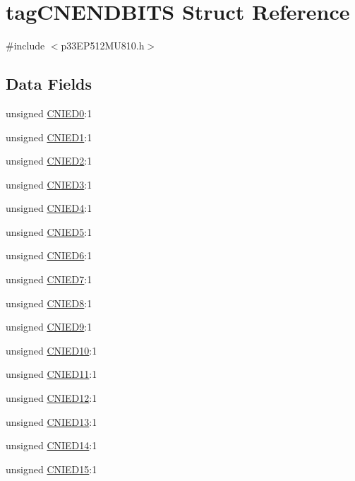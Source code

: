 \hypertarget{structtag_c_n_e_n_d_b_i_t_s}{}\section{tag\+C\+N\+E\+N\+D\+B\+I\+TS Struct Reference}
\label{structtag_c_n_e_n_d_b_i_t_s}


{\ttfamily \#include $<$p33\+E\+P512\+M\+U810.\+h$>$}

\subsection*{Data Fields}
\begin{DoxyCompactItemize}
\item 
unsigned \hyperlink{structtag_c_n_e_n_d_b_i_t_s_a041e181bcc13cfdf4a4053a934ae89eb}{C\+N\+I\+E\+D0}\+:1
\item 
unsigned \hyperlink{structtag_c_n_e_n_d_b_i_t_s_ac9650706edb5cb6b0f3cb6da0e86a325}{C\+N\+I\+E\+D1}\+:1
\item 
unsigned \hyperlink{structtag_c_n_e_n_d_b_i_t_s_a868fe16df021a36a748a28f5f0beb271}{C\+N\+I\+E\+D2}\+:1
\item 
unsigned \hyperlink{structtag_c_n_e_n_d_b_i_t_s_abd6e1802b840d395f5a649f6272fdb16}{C\+N\+I\+E\+D3}\+:1
\item 
unsigned \hyperlink{structtag_c_n_e_n_d_b_i_t_s_a53faa2c6259ed66e4eb2951494c7e3c3}{C\+N\+I\+E\+D4}\+:1
\item 
unsigned \hyperlink{structtag_c_n_e_n_d_b_i_t_s_a5de0f53ff470f45ce1d755d28dc977e1}{C\+N\+I\+E\+D5}\+:1
\item 
unsigned \hyperlink{structtag_c_n_e_n_d_b_i_t_s_a5503c116322a77c3132e97d329d494a7}{C\+N\+I\+E\+D6}\+:1
\item 
unsigned \hyperlink{structtag_c_n_e_n_d_b_i_t_s_af7e614d2f78b8d8a8699f163f7404873}{C\+N\+I\+E\+D7}\+:1
\item 
unsigned \hyperlink{structtag_c_n_e_n_d_b_i_t_s_a5678fe113a6158d62edafa9e2fc3f202}{C\+N\+I\+E\+D8}\+:1
\item 
unsigned \hyperlink{structtag_c_n_e_n_d_b_i_t_s_a55b6caffaf528ff7859ff5eb88158a99}{C\+N\+I\+E\+D9}\+:1
\item 
unsigned \hyperlink{structtag_c_n_e_n_d_b_i_t_s_acaf1eae0717e30a9451cce3a817c9e4e}{C\+N\+I\+E\+D10}\+:1
\item 
unsigned \hyperlink{structtag_c_n_e_n_d_b_i_t_s_ad71944451e11255ec62b8a06d5b2c686}{C\+N\+I\+E\+D11}\+:1
\item 
unsigned \hyperlink{structtag_c_n_e_n_d_b_i_t_s_a2d287c4c52d266ab2d320aa7e517d1f6}{C\+N\+I\+E\+D12}\+:1
\item 
unsigned \hyperlink{structtag_c_n_e_n_d_b_i_t_s_a7c4acb322edeca083d48bd145fe77148}{C\+N\+I\+E\+D13}\+:1
\item 
unsigned \hyperlink{structtag_c_n_e_n_d_b_i_t_s_a89c413512bcb9a96f1db7eb0389befc5}{C\+N\+I\+E\+D14}\+:1
\item 
unsigned \hyperlink{structtag_c_n_e_n_d_b_i_t_s_a1cb70e3a5a0ad25205b3a2607dc028dd}{C\+N\+I\+E\+D15}\+:1
\end{DoxyCompactItemize}


